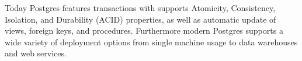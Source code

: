 Today Postgres features transactions with supports Atomicity, Consistency, Isolation, and Durability (ACID) properties, as well as automatic update of views, foreign keys, and procedures. 
Furthermore modern Postgres supports a wide variety of deployment options from single machine usage to data warehouses and web services\cite{Postgres_Docs}.





